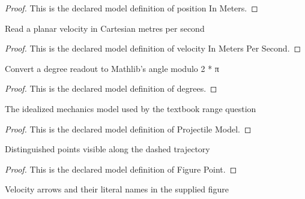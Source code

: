 \begin{proof}
  This is the declared model definition of position In Meters.
\end{proof}
\begin{definition}
  \label{def:physics:phyx-mini-0796:phyxminiproblems-problemphyxmini0796-velocityinmeterspersecond}
  Read a planar velocity in Cartesian metres per second
\end{definition}
\begin{proof}
  This is the declared model definition of velocity In Meters Per Second.
\end{proof}
\begin{definition}[degrees]
  \label{def:physics:phyx-mini-0796:phyxminiproblems-problemphyxmini0796-degrees}
  Convert a degree readout to Mathlib's angle modulo 2 * π
\end{definition}
\begin{proof}
  This is the declared model definition of degrees.
\end{proof}
\begin{definition}
  \label{def:physics:phyx-mini-0796:phyxminiproblems-problemphyxmini0796-projectilemodel}
  The idealized mechanics model used by the textbook range question
\end{definition}
\begin{proof}
  This is the declared model definition of Projectile Model.
\end{proof}
\begin{definition}
  \label{def:physics:phyx-mini-0796:phyxminiproblems-problemphyxmini0796-figurepoint}
  Distinguished points visible along the dashed trajectory
\end{definition}
\begin{proof}
  This is the declared model definition of Figure Point.
\end{proof}
\begin{definition}
  \label{def:physics:phyx-mini-0796:phyxminiproblems-problemphyxmini0796-figurevelocitylabel}
  Velocity arrows and their literal names in the supplied figure
\end{definition}
